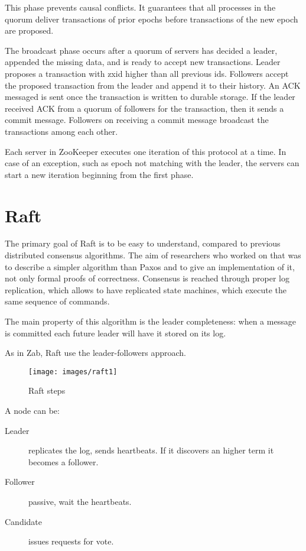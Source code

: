 This phase prevents causal conflicts. It guarantees that all processes in the quorum deliver transactions of prior epochs before transactions of the new epoch are proposed.

The broadcast phase occurs after a quorum of servers has decided a leader, appended the missing data, and is ready to accept new transactions.
Leader proposes a transaction with zxid higher than all previous ids.
Followers accept the proposed transaction from the leader and append it to their history. An ACK messaged is sent once the transaction is written to durable storage.
If the leader received ACK from a quorum of followers for the transaction, then it sends a commit message.
Followers on receiving a commit message broadcast the transactions among each other.

Each server in ZooKeeper executes one iteration of this protocol at a time. In case of an exception, such as epoch not matching with the leader, the servers can start a new iteration beginning from the first phase.

\section{Raft\label{sec:raft}}

The primary goal of Raft is to be easy to understand, compared to previous distributed consensus algorithms.
The aim of researchers who worked on that was to describe a simpler algorithm than Paxos and to give an implementation of it, not only formal proofs of correctness.
Consensus is reached through proper log replication, which allows to have replicated state machines, which execute the same sequence of commands.

The main property of this algorithm is the leader completeness: when a message is committed each future leader will have it stored on its log.

As in Zab, Raft use the leader-followers approach.

\begin{figure}[H]
    \centering
    \texttt{[image: images/raft1]}
    \caption{Raft steps}
    \label{fig:raft}
\end{figure}

A node can be:
\begin{description}
    \item[Leader] replicates the log, sends heartbeats. If it discovers an higher term it becomes a follower.
    \item[Follower] passive, wait the heartbeats.
    \item[Candidate] issues requests for vote.   
\end{description}

